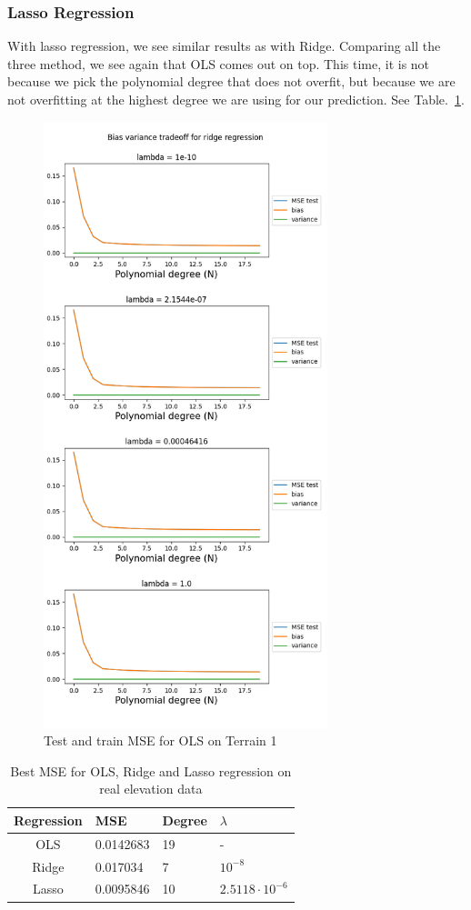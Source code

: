 \documentclass[twocolumn,10pt,cleanfoot]{asme2ej}
\begin{document}
\subsubsection{Lasso Regression}

With lasso regression, we see similar results as with Ridge. Comparing all the three method, we see again that OLS comes out on top. This time, it is not because we pick the polynomial degree that does not overfit, but because we are not overfitting at the highest degree we are using for our prediction. See Table.~\ref{ols_vs_ridge_vs_lasso_table_real}.

\begin{figure} 
\centerline{\includegraphics[width=3.25in]{figure/real1ridgedifflambdas.png}}
\caption{Test and train MSE for OLS on Terrain 1}
\label{real1ridgedifflambdas}
\end{figure}

\begin{table}[t]
\caption{Best MSE for OLS, Ridge and Lasso regression on real elevation data}
\begin{center}
\label{ols_vs_ridge_vs_lasso_table_real}
\begin{tabular}{c | l l l}
Regression & MSE & Degree & $\lambda$ \\
\hline
OLS & 0.0142683 & 19 & - \\
Ridge & 0.017034 & 7 & $10^{-8}$ \\
Lasso & 0.0095846 & 10 & $2.5118 \cdot 10^{-6}$ \\
\hline
\end{tabular}
\end{center}
\end{table}
\end{document}
